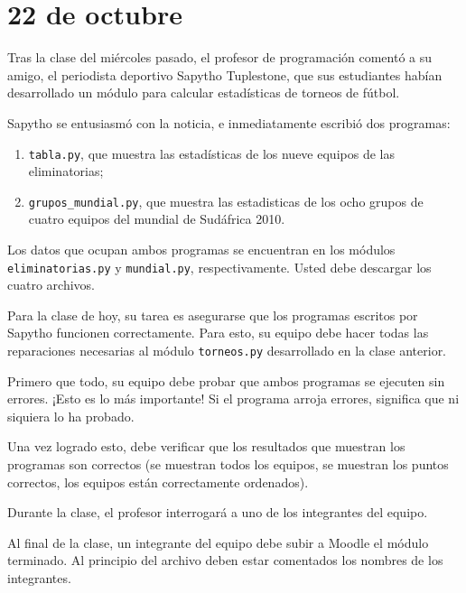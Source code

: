 \documentclass[12pt,spanish]{article}
\begin{document}
  \section*{22 de octubre}

  Tras la clase del miércoles pasado,
  el profesor de programación comentó a su amigo,
  el periodista deportivo Sapytho Tuplestone,
  que sus estudiantes habían desarrollado un módulo
  para calcular estadísticas de torneos de fútbol.

  Sapytho se entusiasmó con la noticia,
  e inmediatamente escribió dos programas:

  \begin{enumerate}[leftmargin=0pt]
    \item \verb!tabla.py!,
      que muestra las estadísticas de los nueve equipos de las eliminatorias;
    \item \verb!grupos_mundial.py!,
      que muestra las estadisticas de los ocho grupos de cuatro equipos
      del mundial de Sudáfrica 2010.
  \end{enumerate}

  Los datos que ocupan ambos programas
  se encuentran en los módulos \verb!eliminatorias.py! y \verb!mundial.py!, respectivamente.
  Usted debe descargar los cuatro archivos.

  Para la clase de hoy,
  su tarea es asegurarse que los programas escritos por Sapytho funcionen correctamente.
  Para esto, su equipo debe hacer todas las reparaciones necesarias
  al módulo \verb!torneos.py! desarrollado en la clase anterior.

  Primero que todo,
  su equipo debe probar que ambos programas se ejecuten sin errores.
  ¡Esto es lo más importante!
  Si el programa arroja errores, significa que ni siquiera lo ha probado.

  Una vez logrado esto,
  debe verificar que los resultados que muestran los programas son correctos
  (se muestran todos los equipos, se muestran los puntos correctos,
  los equipos están correctamente ordenados).

  Durante la clase,
  el profesor interrogará a uno de los integrantes del equipo.

  Al final de la clase,
  un integrante del equipo debe subir a Moodle el módulo terminado.
  Al principio del archivo deben estar comentados los nombres de los integrantes.
\end{document}
